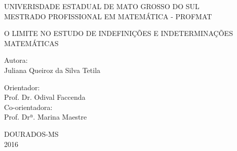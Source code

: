 \thispagestyle{empty}
\begin{center}


\normalsize{UNIVERISDADE ESTADUAL DE MATO GROSSO DO SUL\\ MESTRADO PROFISSIONAL EM MATEMÁTICA - PROFMAT}


\vspace*{3cm}

\Large{O LIMITE NO ESTUDO DE INDEFINIÇÕES E INDETERMINAÇÕES MATEMÁTICAS}


\vspace*{3cm}
\normalsize{Autora:}\\
\normalsize{Juliana Queiroz da Silva Tetila}

\vspace*{2cm}
\normalsize{Orientador:}\\
\normalsize{Prof. Dr. Odival Faccenda}\\
\normalsize{Co-orientadora:}\\
\normalsize{Prof. Drª. Marina Maestre}
\vspace*{6cm}


\large{DOURADOS-MS \\ 2016}
\end{center}